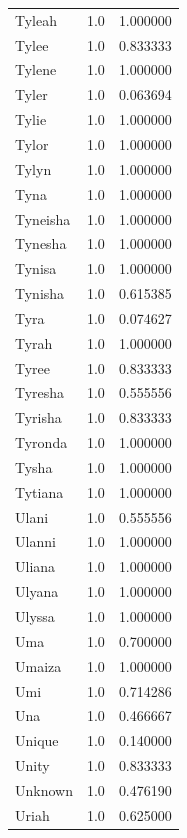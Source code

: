 \documentclass[
  letterpaper,
  DIV=11,
  numbers=noendperiod]{scrreprt}
\begin{document}
\begin{tabular}{lrr}
Tyleah          &   1.0 &   1.000000 \\
Tylee           &   1.0 &   0.833333 \\
Tylene          &   1.0 &   1.000000 \\
Tyler           &   1.0 &   0.063694 \\
Tylie           &   1.0 &   1.000000 \\
Tylor           &   1.0 &   1.000000 \\
Tylyn           &   1.0 &   1.000000 \\
Tyna            &   1.0 &   1.000000 \\
Tyneisha        &   1.0 &   1.000000 \\
Tynesha         &   1.0 &   1.000000 \\
Tynisa          &   1.0 &   1.000000 \\
Tynisha         &   1.0 &   0.615385 \\
Tyra            &   1.0 &   0.074627 \\
Tyrah           &   1.0 &   1.000000 \\
Tyree           &   1.0 &   0.833333 \\
Tyresha         &   1.0 &   0.555556 \\
Tyrisha         &   1.0 &   0.833333 \\
Tyronda         &   1.0 &   1.000000 \\
Tysha           &   1.0 &   1.000000 \\
Tytiana         &   1.0 &   1.000000 \\
Ulani           &   1.0 &   0.555556 \\
Ulanni          &   1.0 &   1.000000 \\
Uliana          &   1.0 &   1.000000 \\
Ulyana          &   1.0 &   1.000000 \\
Ulyssa          &   1.0 &   1.000000 \\
Uma             &   1.0 &   0.700000 \\
Umaiza          &   1.0 &   1.000000 \\
Umi             &   1.0 &   0.714286 \\
Una             &   1.0 &   0.466667 \\
Unique          &   1.0 &   0.140000 \\
Unity           &   1.0 &   0.833333 \\
Unknown         &   1.0 &   0.476190 \\
Uriah           &   1.0 &   0.625000 \\

\end{tabular}
\end{document}
